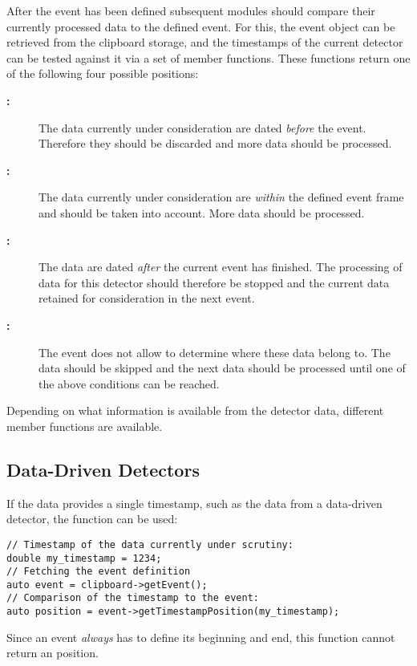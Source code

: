 After the event has been defined subsequent modules should compare their currently processed data to the defined event.
For this, the event object can be retrieved from the clipboard storage, and the timestamps of the current detector can be tested against it via a set of member functions.
These functions return one of the following four possible positions:
\begin{description}
        \item[\textbf{:}] The data currently under consideration are dated \emph{before} the event. Therefore they should be discarded and more data should be processed.
        \item[\textbf{:}] The data currently under consideration are \emph{within} the defined event frame and should be taken into account. More data should be processed.
        \item[\textbf{:}] The data are dated \emph{after} the current event has finished. The processing of data for this detector should therefore be stopped and the current data retained for consideration in the next event.
        \item[\textbf{:}] The event does not allow to determine where these data belong to. The data should be skipped and the next data should be processed until one of the above conditions can be reached.
\end{description}

Depending on what information is available from the detector data, different member functions are available.

\subsection{Data-Driven Detectors}
If the data provides a single timestamp, such as the data from a data-driven detector, the  function can be used:

\begin{verbatim}
// Timestamp of the data currently under scrutiny:
double my_timestamp = 1234;
// Fetching the event definition
auto event = clipboard->getEvent();
// Comparison of the timestamp to the event:
auto position = event->getTimestampPosition(my_timestamp);
\end{verbatim}

Since an event \emph{always} has to define its beginning and end, this function cannot return an  position.

